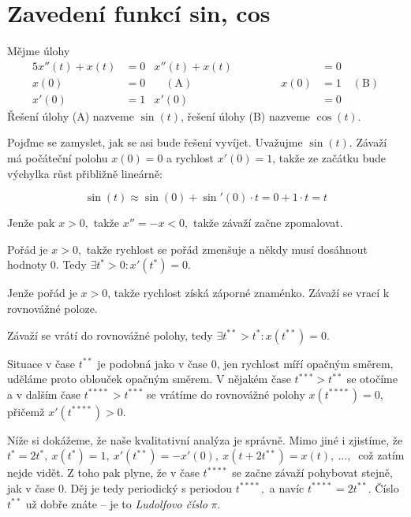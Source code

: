 \section{Zavedení funkcí sin, cos}
\begin{definice}
  Mějme úlohy
  \begin{alignat*}{5}
	  x''(t)+x(t) &= 0 & x''(t)+x(t) &= 0 \\
	  x(0) &= 0 & \quad (\text{A}) \hspace{8em}       x(0) &= 1 \quad (\text{B}) \\
	  	x'(0) &= 1 & 		           x'(0) &= 0
  \end{alignat*}
  Řešení úlohy (A) nazveme $\sin(t)$, řešení úlohy (B) nazveme $\cos(t).$
\end{definice}

\begin{poznámka}
  Pojďme se zamyslet, jak se asi bude řešení vyvíjet. Uvažujme $\sin(t)$. Závaží má počáteční polohu $x(0)=0$ a rychlost $x'(0)=1$, takže ze začátku bude výchylka růst přibližně lineárně:

  \begin{equation*}
    \sin(t)\approx \sin(0)+\sin'(0)\cdot t=0+1\cdot t = t
  \end{equation*}

  Jenže pak $x>0,$ takže $x''=-x<0,$ takže závaží začne zpomalovat.

  Pořád je $x>0,$ takže rychlost se pořád zmenšuje a někdy musí dosáhnout hodnoty $0$. Tedy $\exists t^{*}>0\colon x'(t^{*})=0.$

  Jenže pořád je $x>0$, takže rychlost získá záporné znaménko. Závaží se vrací k rovnovážné poloze. 

  Závaží se vrátí do rovnovážné polohy, tedy $\exists t^{**}>t^{*}\colon x(t^{**})=0.$

  Situace v čase $t^{**}$ je podobná jako v čase $0$, jen rychlost míří opačným směrem, uděláme proto oblouček opačným směrem. V nějakém čase $t^{***}>t^{**}$ se otočíme a v dalším čase $t^{****}>t^{***}$ se vrátíme do rovnovážné polohy $x(t^{****})=0$, přičemž $x'(t^{****})>0.$

  Níže si dokážeme, že naše kvalitativní analýza je správně. Mimo jiné i zjistíme, že $t^{*}=2t^{*},\ x(t^{*})=1,\ x'(t^{**})=-x'(0),\ x(t+2t^{**})=x(t),\ \hdots,\ $ což zatím nejde vidět. Z toho pak plyne, že v čase $t^{****}$ se začne závaží pohybovat stejně, jak v čase 0. Děj je tedy periodický s periodou $t^{****},$ a navíc $t^{****}=2t^{**}.$ Číslo $t^{**}$ už dobře znáte -- je to \emph{Ludolfovo číslo} $\pi$.
\end{poznámka}

